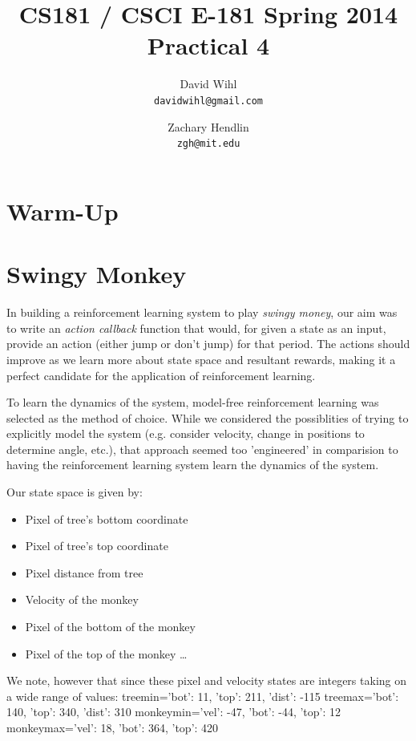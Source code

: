 \documentclass[11pt, oneside]{article}   	%
\title{CS181 / CSCI E-181 Spring 2014 Practical 4}
\author{
  David Wihl\\
  \texttt{davidwihl@gmail.com}
  \and
  Zachary Hendlin\\
  \texttt{zgh@mit.edu} 
}
\begin{document}
\maketitle
\section*{Warm-Up}


\section*{Swingy Monkey}
In building a reinforcement learning system to play \textit{swingy money}, our aim was to write an \textit{action callback} function that would, for given a state as an input, provide an action (either jump or don't jump) for that period. The actions should improve as we learn more about state space and resultant rewards, making it a perfect candidate for the application of reinforcement learning.

To learn the dynamics of the system, model-free reinforcement learning was selected as the method of choice. While we considered the possiblities of trying to explicitly model the system (e.g. consider velocity, change in positions to determine angle, etc.), that approach seemed too 'engineered' in comparision to having the reinforcement learning system learn the dynamics of the system.

Our state space is given by:

\begin{itemize}

  \item Pixel of tree's bottom coordinate
  \item Pixel of tree's top coordinate
  \item Pixel distance from tree
  \item Velocity of the monkey
  \item Pixel of the bottom of the monkey
  \item Pixel of the top of the monkey \ldots

\end{itemize}

We note, however that since these pixel and velocity states are integers taking on a wide range of values:
\newline
treemin={'bot': 11, 'top': 211, 'dist': -115}
\newline
treemax={'bot': 140, 'top': 340, 'dist': 310}
\newline
monkeymin={'vel': -47, 'bot': -44, 'top': 12}
\newline
monkeymax={'vel': 18, 'bot': 364, 'top': 420}
\newline 
\end{document}
